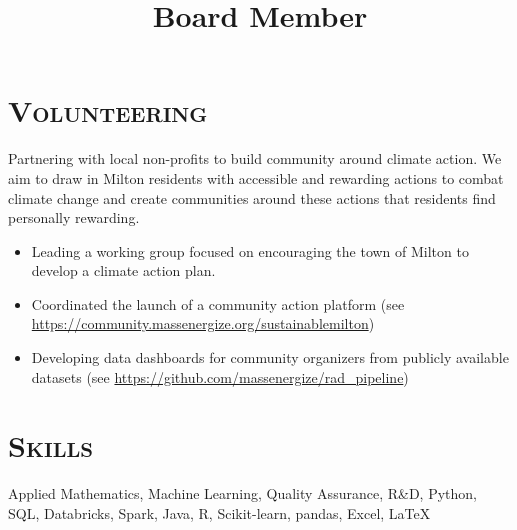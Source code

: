 \begin{resume}
\section{\textsc{Volunteering}}

\title{Board Member}
\begin{position}
Partnering with local non-profits to build community around climate action.  We aim to draw in Milton residents with accessible and rewarding actions to combat climate change and create communities around these actions that residents find personally rewarding. 
\begin{itemize}
    \item Leading a working group focused on encouraging the town of Milton to develop a climate action plan.
    \item Coordinated the launch of a community action platform \newline (see \url{https://community.massenergize.org/sustainablemilton})
    \item Developing data dashboards for community organizers from publicly available datasets
    \newline (see \url{https://github.com/massenergize/rad_pipeline})
\end{itemize}
\end{position}


\section{\textsc{Skills}}
Applied Mathematics, Machine Learning, Quality Assurance, R\&D, Python, SQL, Databricks, Spark, Java, R, Scikit-learn, pandas, Excel, \LaTeX



\end{resume}
